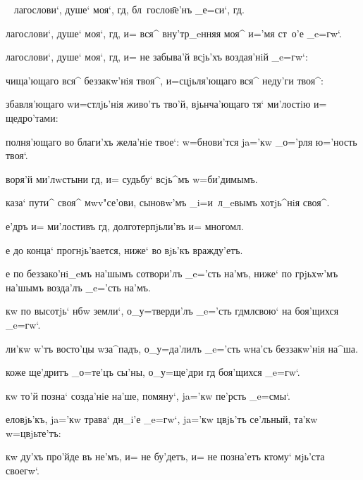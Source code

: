 \documentclass[12pt,twoside,a6paper,xdvi,civil=antiqua]{hipbook}
\newcommand{\xpref}[1]{\rem{#1:}\ }
\renewcommand{\*}{~~\raise3pt\hbox{\footnotesize*}}
\begin{document}
{
  
\xpref{_Псало'мъ р~в} {\large{}лагослови`, душе` моя`, гд,
    бл~го\-сло\=ве'нъ _е=си`, гд.
}
  
{\large{}лагослови`, душе` моя`, гд, и= вся^ вну'тр_eнняя
  моя^ и='мя ст~о'е _e=гw`.\par}

{\large{}лагослови`, душе` моя`, гд, и= не забыва'й всjь'хъ
воздая'нiй _e=гw`:\par}

{\large{}чища'ющаго вся^ беззакw'нiя твоя^, и=с\-цjь\-ля'\-ю\-ща\-го
вся^ неду'ги твоя^:\par}

збавля'ющаго w\т и=стлjь'нiя живо'тъ тво'й, вjьнча'ющаго тя`
ми'лостiю и= щедро'тами:

\-пол\-ня'\-ю\-ща\-го во благи'хъ жела'нiе твое`: w=бнови'тся
ja='кw _о='рля ю='ность твоя`.

воря'й ми'лwстыни гд, и= судьбу` всjь^мъ w=би'димымъ.

каза` пути^ своя^ мwv"се'ови, сыновw'мъ _i=и~л_eвымъ хотjь^нiя своя^.

{\large{}е'дръ и= ми'лостивъ гд, долготерпjьли'въ и= многомл.}

е до конца` прогнjь'вается, ниже` во вjь'къ вражду'етъ.

е по
беззако'нi_eмъ на'шымъ сотвори'лъ _e='сть на'мъ, ниже` по грjьхw'мъ
на'шымъ возда'лъ _e='сть на'мъ. 

кw по высотjь` нб w\т
земли`, о_у=\-твер\-ди'лъ _e='сть гд мл свою` на боя'щихся _e=гw`.

ли'кw w'тъ восто'цы w\т за^падъ, о_у=да'лилъ _e='сть w\т на'съ
беззакw'нiя на^ша. 

коже ще'дритъ _о=те'цъ сы'ны, о_у=ще'дри гд
боя'щихся _e=гw`. 

кw то'й позна` созда'нiе на'ше, помяну`, ja='кw
пе'рсть _e=смы`. 

еловjь'къ, ja='кw трава` дн_i'е _e=гw`, ja='кw
цвjь'тъ се'льный, та'кw w=цвjьте'тъ: 

кw ду'хъ про'йде въ не'мъ, и=
не бу'детъ, и= не позна'етъ ктому` мjь'ста своегw`. 

}
\end{document}
